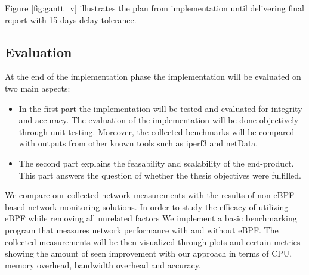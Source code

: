 Figure \ref{fig:gantt_v} illustrates the plan from implementation until delivering final report with 15 days
delay tolerance.\\

\subsection{Evaluation}

At the end of the implementation phase the implementation will be evaluated on two main aspects:
\begin{itemize}
    \item In the first part the implementation will be tested and evaluated for integrity and accuracy.
    The evaluation of the implementation will be done objectively through unit testing.
    Moreover, the collected benchmarks will be compared with outputs from other known tools such as iperf3\cite{iperf3} and netData.
    \item The second part explains the feasability and scalability of the end-product.
    This part answers the question of whether the thesis objectives were fulfilled.
\end{itemize}

We compare our collected network measurements
with the results of non-eBPF-based network monitoring solutions.
In order to study the efficacy of utilizing eBPF while removing all unrelated factors We implement a basic benchmarking program
that measures network performance with and without eBPF. The collected measurements will be then visualized through plots
and certain metrics showing the amount of seen improvement with our approach in terms of CPU, memory overhead, bandwidth overhead and accuracy.